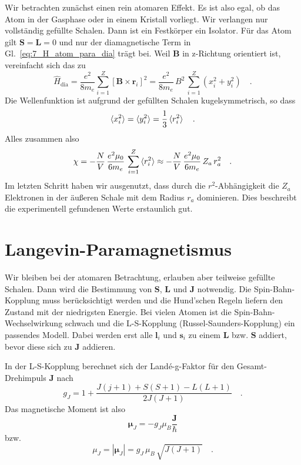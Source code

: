 Wir betrachten zunächst einen rein atomaren Effekt. Es ist also egal, ob das Atom in der Gasphase oder in einem Kristall vorliegt. Wir verlangen nur  vollständig gefüllte Schalen. Dann ist ein Festkörper ein Isolator. Für das Atom gilt $\bm{S} = \bm{L} = 0$ und nur der diamagnetische Term in Gl.~\ref{eq:7_H_atom_para_dia} trägt bei.  Weil $\bm{B}$ in z-Richtung orientiert ist, vereinfacht sich das zu
\begin{equation}
    \hat{H}_\text{dia} = 
    \frac{e^2}{8 m_e} 
     \sum_{i=1}^Z  \left[\bm{B} \times \bm{r}_i \right]^2
     = \frac{e^2}{8 m_e} \, B^2 \,
     \sum_{i=1}^Z 
     (x_i^2 + y_i^2) \quad .
\end{equation}
Die Wellenfunktion ist aufgrund der gefüllten Schalen kugelsymmetrisch, so dass
\begin{equation}
    \braket{x_i^2} =  \braket{y_i^2}   = \frac{1}{3} \braket{r_i^2} \quad .
\end{equation}
Alles zusammen also 
\begin{equation}
 \chi = - \frac{N}{V} \, \frac{e^2 \mu_0}{6 m_e} \,   \sum_{i=1}^Z   \braket{r_i^2}
 \approx  - \frac{N}{V} \, \frac{e^2 \mu_0}{6 m_e} \,   Z_a \,  r_a^2   \quad . 
 \label{eq:7_atom_diamag}
\end{equation}
Im letzten Schritt haben wir ausgenutzt, dass durch die $r^2$-Abhängigkeit die $Z_a$ Elektronen in der äußeren Schale mit dem Radius $r_a$ dominieren. Dies beschreibt die experimentell gefundenen Werte erstaunlich gut.






\section*{Langevin-Paramagnetismus}

Wir bleiben bei der atomaren Betrachtung, erlauben aber teilweise gefüllte Schalen. Dann wird die Bestimmung von $\bm{S}$, $\bm{L}$ und $\bm{J}$ notwendig. Die Spin-Bahn-Kopplung muss berücksichtigt werden und die Hund'schen Regeln liefern den  Zustand mit der niedrigsten Energie. Bei vielen Atomen ist die Spin-Bahn-Wechselwirkung schwach und  die L-S-Kopplung (Russel-Saunders-Kopplung) ein passendes Modell. Dabei werden  erst alle $\bm{l}_i$ und $\bm{s}_i$ zu einem $\bm{L}$ bzw. $\bm{S}$ addiert, bevor diese sich zu $\bm{J}$ addieren. 

In der L-S-Kopplung  berechnet sich der Landé-g-Faktor für den Gesamt-Drehimpuls $\bm{J}$ nach
\begin{equation}
    g_J = 1 + \frac{J (j+1) + S (S+1) - L (L+1)}{2 J (J+1)} \quad .
\end{equation}
Das magnetische Moment ist also
\begin{equation}
    \bm{\mu}_J = - g_J \mu_B  \frac{\bm J}{\hbar}
\end{equation}
bzw.
\begin{equation}
    \mu_J  = |\bm{\mu}_J | = g_J \, \mu_B  \, \sqrt{J (J+1)} \quad .
\end{equation}

